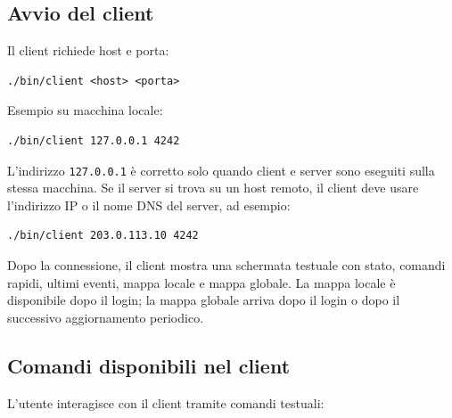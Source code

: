 \documentclass[11pt,a4paper]{article}
\begin{document}
\subsection{Avvio del client}

Il client richiede host e porta:

\begin{lstlisting}[style=textstyle]
./bin/client <host> <porta>
\end{lstlisting}

Esempio su macchina locale:

\begin{lstlisting}[style=textstyle]
./bin/client 127.0.0.1 4242
\end{lstlisting}

L'indirizzo \texttt{127.0.0.1} è corretto solo quando client e server sono
eseguiti sulla stessa macchina. Se il server si trova su un host remoto, il
client deve usare l'indirizzo IP o il nome DNS del server, ad esempio:

\begin{lstlisting}[style=textstyle]
./bin/client 203.0.113.10 4242
\end{lstlisting}

Dopo la connessione, il client mostra una schermata testuale con stato,
comandi rapidi, ultimi eventi, mappa locale e mappa globale. La mappa locale è
disponibile dopo il login; la mappa globale arriva dopo il login o dopo il
successivo aggiornamento periodico.

\subsection{Comandi disponibili nel client}

L'utente interagisce con il client tramite comandi testuali:
\end{document}
